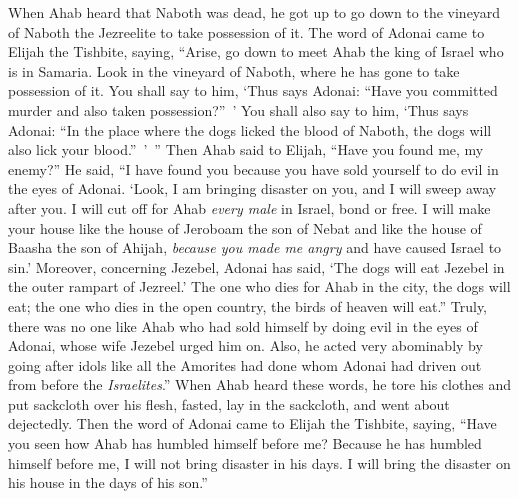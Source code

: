 \begin{biblechapter}
\verse When Ahab heard that Naboth was dead, he got up to go down to the vineyard of Naboth the Jezreelite to take possession of it.
 The word of Adonai came to Elijah the Tishbite, saying,
\verse “Arise, go down to meet Ahab the king of Israel who is in Samaria. Look in the vineyard of Naboth, where he has gone to take possession of it.
\verse You shall say to him, ‘Thus says Adonai: “Have you committed murder and also taken possession?” ’ You shall also say to him, ‘Thus says Adonai: “In the place where the dogs licked the blood of Naboth, the dogs will also lick your blood.” ’ ”
\verse Then Ahab said to Elijah, “Have you found me, my enemy?” He said, “I have found you because you have sold yourself to do evil in the eyes of Adonai.
\verse ‘Look, I am bringing disaster on you, and I will sweep away after you. I will cut off for Ahab \textit{every male} in Israel, bond or free.
\verse I will make your house like the house of Jeroboam the son of Nebat and like the house of Baasha the son of Ahijah, \textit{because you made me angry} and have caused Israel to sin.’
\verse Moreover, concerning Jezebel, Adonai has said, ‘The dogs will eat Jezebel in the outer rampart of Jezreel.’
\verse The one who dies for Ahab in the city, the dogs will eat; the one who dies in the open country, the birds of heaven will eat.”
\verse Truly, there was no one like Ahab who had sold himself by doing evil in the eyes of Adonai, whose wife Jezebel urged him on.
\verse Also, he acted very abominably by going after idols like all the Amorites had done whom Adonai had driven out from before the \textit{Israelites}.”
\verse When Ahab heard these words, he tore his clothes and put sackcloth over his flesh, fasted, lay in the sackcloth, and went about dejectedly.
\verse Then the word of Adonai came to Elijah the Tishbite, saying,
\verse “Have you seen how Ahab has humbled himself before me? Because he has humbled himself before me, I will not bring disaster in his days. I will bring the disaster on his house in the days of his son.”
\end{biblechapter}


